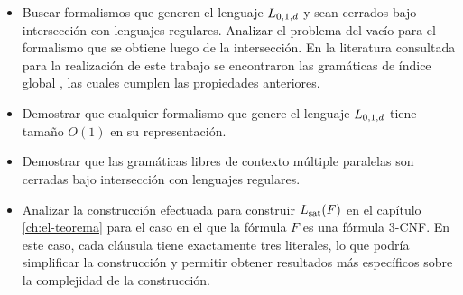 \begin{conclusionsAndRecomendations}
    \begin{itemize}
        \item Buscar formalismos que generen el lenguaje $L_{0,1,d}$ y sean cerrados bajo intersección con lenguajes regulares. Analizar el problema del vacío para el formalismo que se obtiene luego de la intersección. En la literatura consultada para la realización de este trabajo se encontraron las gramáticas de índice global \cite{globalIndexLanguages}, las cuales cumplen las propiedades anteriores.
        \item Demostrar que cualquier formalismo que genere el lenguaje $L_{0,1,d}$ tiene tamaño $O(1)$ en su representación.
        \item Demostrar que las gramáticas libres de contexto múltiple paralelas son cerradas bajo intersección con lenguajes regulares.
        \item Analizar la construcción efectuada para construir $L_{\mathrm{sat}}(F)$ en el capítulo \ref{ch:el-teorema} para el caso en el que la fórmula $F$ es una fórmula 3-CNF. En este caso, cada cláusula tiene exactamente tres literales, lo que podría simplificar la construcción y permitir obtener resultados más específicos sobre la complejidad de la construcción.
    \end{itemize}
\end{conclusionsAndRecomendations}
